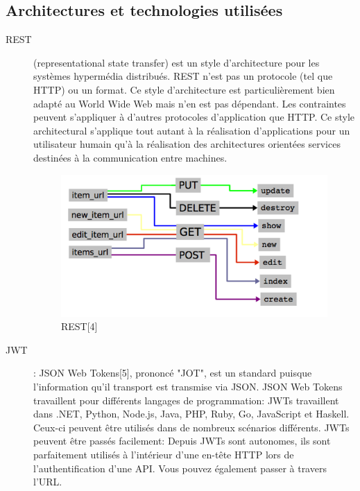 \documentclass[12pt, ChapStyle1, oneside]{./Styles/Dea_Gsm}
\begin{document}
\subsection{Architectures et technologies utilisées}
\begin{description}
\item [REST] (representational state transfer) est un style d’architecture pour les systèmes hypermédia distribués.
REST n’est pas un protocole (tel que HTTP) ou un format. Ce style d'architecture est particulièrement bien adapté au World Wide Web mais n'en est pas dépendant. Les contraintes peuvent s'appliquer à d'autres protocoles d'application que HTTP.
Ce style architectural s'applique tout autant à la réalisation d’applications pour un utilisateur humain qu'à la réalisation des architectures orientées services destinées à la communication entre machines.
\begin{figure}[H]
    \centering
    \includegraphics[width=5.0in]{rest}
    \caption{REST[4]}
    \label{REST}
\end{figure}

\item [JWT] : JSON Web Tokens[5], prononcé "JOT", est un standard puisque l'information qu'il transport est transmise via JSON.
JSON Web Tokens travaillent pour différents langages de programmation: JWTs travaillent dans .NET, Python, Node.js, Java, PHP, Ruby, Go, JavaScript et Haskell. Ceux-ci peuvent être utilisés dans de nombreux scénarios différents.
JWTs peuvent être passés facilement: Depuis JWTs sont autonomes, ils sont parfaitement utilisés à l'intérieur d'une en-tête HTTP lors de l'authentification d'une API. Vous pouvez également passer à travers l’URL.


\end{description}
\end{document}
